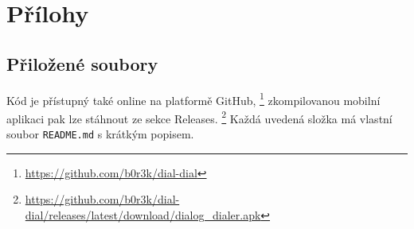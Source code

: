 \documentclass[12pt,a4paper]{report}
\begin{document}
\appendix
\chapter{Přílohy}

\section{Přiložené soubory}\label{appendix-file}

Kód je přístupný také online na platformě GitHub,%
\footnote{\url{https://github.com/b0r3k/dial-dial}}
zkompilovanou mobilní aplikaci pak lze stáhnout ze sekce Releases.%
\footnote{\url{https://github.com/b0r3k/dial-dial/releases/latest/download/dialog_dialer.apk}}
Každá uvedená složka má vlastní soubor \texttt{README.md} s krátkým popisem.
\end{document}
